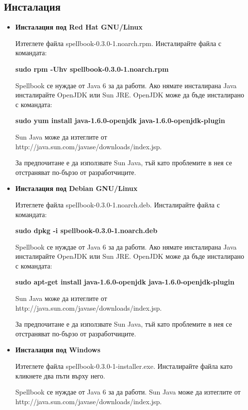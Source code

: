 \subsection{Инсталация}
\begin{itemize}
  \item \textbf{Инсталация под Red Hat GNU/Linux}

    Изтеглете файла spellbook-0.3.0-1.noarch.rpm. Инсталирайте файла с
    командата:

    \textbf{sudo rpm -Uhv spellbook-0.3.0-1.noarch.rpm}

    Spellbook се нуждае от Java 6 за да работи. Ако нямате инсталирана
    Java инсталирайте OpenJDK или Sun JRE. OpenJDK може да бъде
    инсталирано с командата:

    \textbf{sudo yum install java-1.6.0-openjdk java-1.6.0-openjdk-plugin}

    Sun Java може да изтеглите от
    http://java.sun.com/javase/downloads/index.jsp. 

    За предпочитане е да използвате Sun Java, тъй като проблемите в
    нея се отстраняват по-бързо от разработчиците.
   
    \item \textbf{Инсталация под Debian GNU/Linux}

      Изтеглете файла spellbook-0.3.0-1.noarch.deb. Инсталирайте файла с
    командата:

    \textbf{sudo dpkg -i spellbook-0.3.0-1.noarch.deb}

    Spellbook се нуждае от Java 6 за да работи. Ако нямате инсталирана
    Java инсталирайте OpenJDK или Sun JRE. OpenJDK може да бъде
    инсталирано с командата:

    \textbf{sudo apt-get install java-1.6.0-openjdk java-1.6.0-openjdk-plugin}

    Sun Java може да изтеглите от
    http://java.sun.com/javase/downloads/index.jsp. 

    За предпочитане е да използвате Sun Java, тъй като проблемите в
    нея се отстраняват по-бързо от разработчиците.

    \item \textbf{Инсталация под Windows}

      Изтеглете файла spellbook-0.3.0-1-installer.exe. Инсталирайте
      файла като кликнете два пъти върху него.

    Spellbook се нуждае от Java 6 за да работи. Sun Java може да изтеглите от
    http://java.sun.com/javase/downloads/index.jsp. 


\end{itemize}
